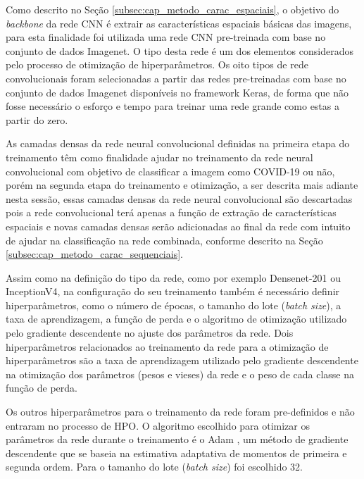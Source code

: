 Como descrito no Seção \ref{subsec:cap_metodo_carac_espaciais}, o objetivo do \textit{backbone} da rede CNN é extrair as características espaciais básicas das imagens, para esta finalidade foi utilizada uma rede CNN pre-treinada com base no conjunto de dados Imagenet. O tipo desta rede é um dos elementos considerados pelo processo de otimização de hiperparâmetros. Os oito tipos de rede convolucionais foram selecionadas a partir das redes pre-treinadas com base no conjunto de dados Imagenet disponíveis no framework Keras, de forma que não fosse necessário o esforço e tempo para treinar uma rede grande como estas a partir do zero.

As camadas densas da rede neural convolucional definidas na primeira etapa do treinamento têm como finalidade ajudar no treinamento da rede neural convolucional com objetivo de classificar a imagem como COVID-19 ou não, porém na segunda etapa do treinamento e otimização, a ser descrita mais adiante nesta sessão, essas camadas densas da rede neural convolucional são descartadas pois a rede convolucional terá apenas a função de extração de características espaciais e novas camadas densas serão adicionadas ao final da rede com intuito de ajudar na classificação na rede combinada, conforme descrito na Seção \ref{subsec:cap_metodo_carac_sequenciais}.

Assim como na definição do tipo da rede, como por exemplo Densenet-201 ou InceptionV4, na configuração do seu treinamento também é necessário definir hiperparâmetros, como o número de épocas, o tamanho do lote (\textit{batch size}), a taxa de aprendizagem, a função de perda e o algoritmo de otimização utilizado pelo gradiente descendente no ajuste dos parâmetros da rede. Dois hiperparâmetros relacionados ao treinamento da rede para a otimização de hiperparâmetros são a taxa de aprendizagem utilizado pelo gradiente descendente na otimização dos parâmetros (pesos e vieses) da rede e o peso de cada classe na função de perda. 

Os outros hiperparâmetros para o treinamento da rede foram pre-definidos e não entraram no processo de HPO. O algoritmo escolhido para otimizar os parâmetros da rede durante o treinamento é o Adam \cite{kingma2014adam}, um método de gradiente descendente que se baseia na estimativa adaptativa de momentos de primeira e segunda ordem. Para o tamanho do lote (\textit{batch size}) foi escolhido 32. 


